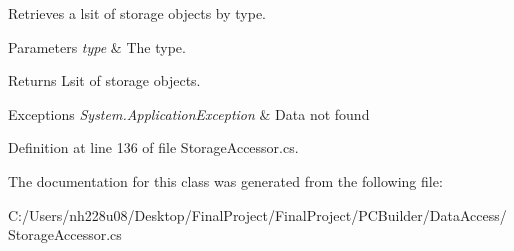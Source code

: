Retrieves a lsit of storage objects by type. 


\begin{DoxyParams}{Parameters}
{\em type} & The type.\\
\hline
\end{DoxyParams}
\begin{DoxyReturn}{Returns}
Lsit of storage objects.
\end{DoxyReturn}

\begin{DoxyExceptions}{Exceptions}
{\em System.\+Application\+Exception} & Data not found\\
\hline
\end{DoxyExceptions}


Definition at line 136 of file Storage\+Accessor.\+cs.



The documentation for this class was generated from the following file\+:\begin{DoxyCompactItemize}
\item 
C\+:/\+Users/nh228u08/\+Desktop/\+Final\+Project/\+Final\+Project/\+P\+C\+Builder/\+Data\+Access/Storage\+Accessor.\+cs\end{DoxyCompactItemize}

